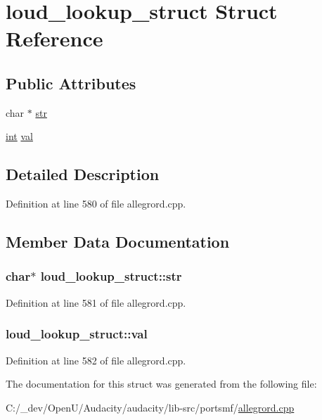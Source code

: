 \hypertarget{structloud__lookup__struct}{}\section{loud\+\_\+lookup\+\_\+struct Struct Reference}
\label{structloud__lookup__struct}
\subsection*{Public Attributes}
\begin{DoxyCompactItemize}
\item 
char $\ast$ \hyperlink{structloud__lookup__struct_a1a786aff5c1f5488ec653fdf2e79075c}{str}
\item 
\hyperlink{xmltok_8h_a5a0d4a5641ce434f1d23533f2b2e6653}{int} \hyperlink{structloud__lookup__struct_aba5a28acb689b15bc3de935e44e58ace}{val}
\end{DoxyCompactItemize}


\subsection{Detailed Description}


Definition at line 580 of file allegrord.\+cpp.



\subsection{Member Data Documentation}
\subsubsection[{\texorpdfstring{str}{str}}]{\setlength{\rightskip}{0pt plus 5cm}char$\ast$ loud\+\_\+lookup\+\_\+struct\+::str}\hypertarget{structloud__lookup__struct_a1a786aff5c1f5488ec653fdf2e79075c}{}\label{structloud__lookup__struct_a1a786aff5c1f5488ec653fdf2e79075c}


Definition at line 581 of file allegrord.\+cpp.

\subsubsection[{\texorpdfstring{val}{val}}]{ loud\+\_\+lookup\+\_\+struct\+::val}\hypertarget{structloud__lookup__struct_aba5a28acb689b15bc3de935e44e58ace}{}\label{structloud__lookup__struct_aba5a28acb689b15bc3de935e44e58ace}


Definition at line 582 of file allegrord.\+cpp.



The documentation for this struct was generated from the following file\+:\begin{DoxyCompactItemize}
\item 
C\+:/\+\_\+dev/\+Open\+U/\+Audacity/audacity/lib-\/src/portsmf/\hyperlink{allegrord_8cpp}{allegrord.\+cpp}\end{DoxyCompactItemize}
